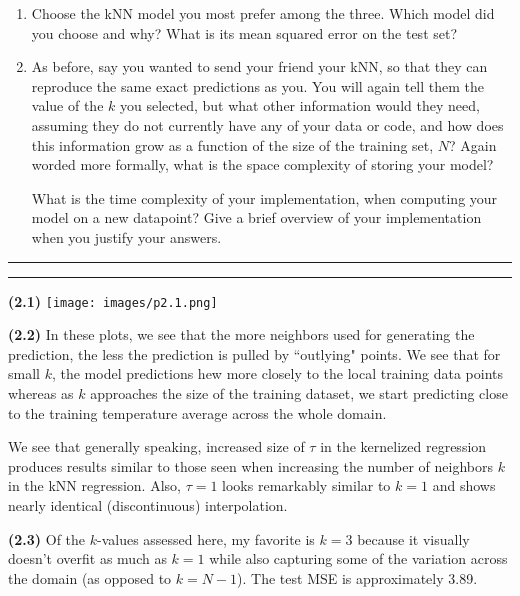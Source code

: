 \documentclass[submit]{harvardml}
\newcommand{\question}[2] {\vspace{.25in} \hrule\vspace{0.5em}
\noindent{\bf #1: #2} \vspace{0.5em}
\hrule \vspace{.10in}}
\renewcommand{\part}[1] {\vspace{.10in} {\bf (#1)}}
\begin{document}
\begin{problem}
\begin{enumerate}
\item Choose the kNN model you most prefer among the three. Which model did you choose and why? What is its mean squared error on the test set?

\item As before, say you wanted to send your friend your kNN, so that they can reproduce the same exact predictions as you. You will again tell them the value of the $k$ you selected, but what other information would they need, assuming they do not currently have any of your data or code, and how does this information grow as a function of the size of the training set, $N$? Again worded more formally, what is the space complexity of storing your model?

What is the time complexity of your implementation, when computing your model on a new datapoint? Give a brief overview of your implementation when you justify your answers. 
\end{enumerate}

\end{problem}

\newpage

\question{2}{Kernels and kNN}

\part{2.1} \texttt{[image: images/p2.1.png]}

\part{2.2} In these plots, we see that the more neighbors used for generating the prediction, the less the prediction is pulled by ``outlying" points. We see that for small $k$, the model predictions hew more closely to the local training data points whereas as $k$ approaches the size of the training dataset, we start predicting close to the training temperature average across the whole domain.


We see that generally speaking, increased size of $\tau$ in the kernelized regression produces results similar to those seen when increasing the number of neighbors $k$ in the kNN regression. Also, $\tau=1$ looks remarkably similar to $k=1$ and shows nearly identical (discontinuous) interpolation. 

\part{2.3} Of the $k$-values assessed here, my favorite is $k=3$ because it visually doesn't overfit as much as $k=1$ while also capturing some of the variation across the domain (as opposed to $k=N-1$). The test MSE is approximately 3.89.
\end{document}
